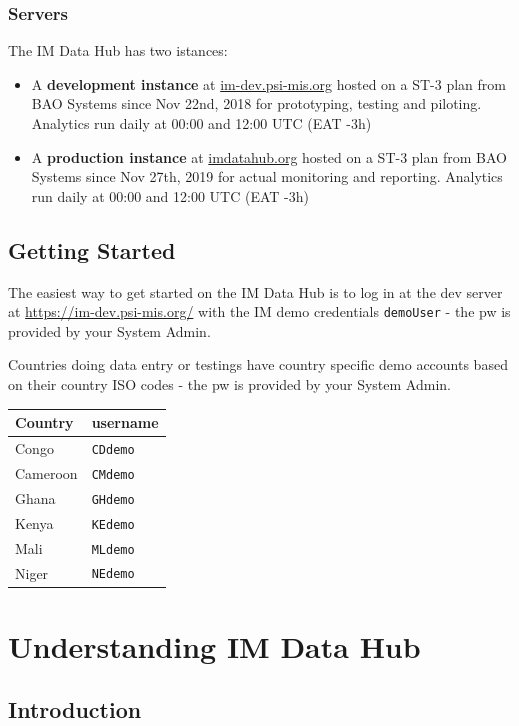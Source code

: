 \documentclass[]{book}
\providecommand{\tightlist}{%
  \setlength{\itemsep}{0pt}\setlength{\parskip}{0pt}}
\begin{document}
\hypertarget{servers}{%
\subsection{Servers}\label{servers}}

The IM Data Hub has two istances:

\begin{itemize}
\tightlist
\item
  A \textbf{development instance} at \href{https://im-dev.psi-mis.org}{im-dev.psi-mis.org} hosted on a ST-3 plan from BAO Systems since Nov 22nd, 2018 for prototyping, testing and piloting. Analytics run daily at 00:00 and 12:00 UTC (EAT -3h)
\item
  A \textbf{production instance} at \href{https://imdatahub.org}{imdatahub.org} hosted on a ST-3 plan from BAO Systems since Nov 27th, 2019 for actual monitoring and reporting. Analytics run daily at 00:00 and 12:00 UTC (EAT -3h)
\end{itemize}

\hypertarget{getting-started}{%
\section{Getting Started}\label{getting-started}}

The easiest way to get started on the IM Data Hub is to log in at the dev server at \url{https://im-dev.psi-mis.org/} with the IM demo credentials \texttt{demoUser} - the pw is provided by your System Admin.

Countries doing data entry or testings have country specific demo accounts based on their country ISO codes - the pw is provided by your System Admin.

\begin{longtable}[]{@{}ll@{}}
\toprule
Country & username\tabularnewline
\midrule
\endhead
Congo & \texttt{CDdemo}\tabularnewline
Cameroon & \texttt{CMdemo}\tabularnewline
Ghana & \texttt{GHdemo}\tabularnewline
Kenya & \texttt{KEdemo}\tabularnewline
Mali & \texttt{MLdemo}\tabularnewline
Niger & \texttt{NEdemo}\tabularnewline
\bottomrule
\end{longtable}

\hypertarget{comp}{%
\chapter{Understanding IM Data Hub}\label{comp}}

\hypertarget{introduction}{%
\section{Introduction}\label{introduction}}
\end{document}
